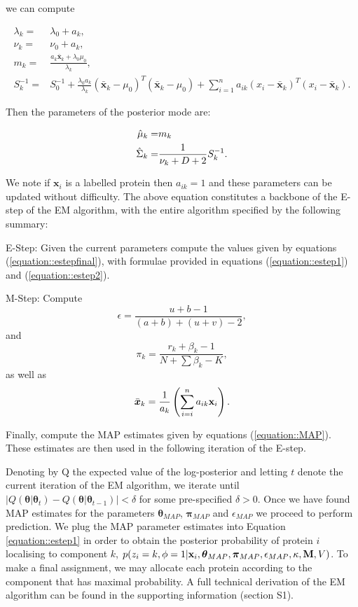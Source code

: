 \documentclass[12pt,english]{article}\usepackage[]{graphicx}\usepackage[]{color}
\begin{document}
we can compute

\begin{equation}\label{equation::Posterior}
\begin{split}
\lambda_k = &\lambda_0 + a_k, \\
\nu_k = & \nu_0 + a_k, \\
m_k = & \frac{a_k\bar{\boldsymbol{x}}_k + \lambda_0\mu_0}{\lambda_k},\\
S_k^{-1}  = & S_0^{-1} + \frac{\lambda_0 a_k}{\lambda_k}(\bar{\boldsymbol{x}}_k - \mu_0)^{T} (\bar{\boldsymbol{x}}_k - \mu_0) + \sum_{i=1}^{n} a_{ik}(x_i -\bar{\boldsymbol{x}}_k)^{T}(x_i -\bar{\boldsymbol{x}}_k).
\end{split}
\end{equation}

Then the parameters of the posterior mode are:

\begin{equation}\label{equation::MAP}
\begin{split}
\hat{{\bf\mu}}_k = &m_k \\
\hat{\Sigma}_k = &\frac{1}{\nu_k + D + 2}S_k^{-1}.
\end{split}
\end{equation}

We note if $\boldsymbol{x}_i$ is a labelled protein then $a_{ik} = 1$
and these parameters can be updated without difficulty.  The above
equation constitutes a backbone of the E-step of the EM algorithm, with
the entire algorithm specified by the following summary:


E-Step: Given the current parameters compute the values given by
equations (\ref{equation::estepfinal}), with formulae provided in
equations (\ref{equation::estep1}) and (\ref{equation::estep2}).

\bigskip

M-Step: Compute
\[\epsilon = \frac{ u + b - 1}{(a+b) + (u+v) - 2},\]
and
\[\pi_k = \frac{r_k + \beta_k - 1}{N + \sum \beta_k - K},\]
as well as
\[\bar{\boldsymbol{x}}_k = \frac{1}{a_k}\left(\sum_{i=i}^{n}a_{ik}{\bf x}_i\right).\]

Finally, compute the MAP estimates given by equations
(\ref{equation::MAP}). These estimates are then used in the following
iteration of the E-step.


Denoting by Q the expected value of the log-posterior and letting $t$
denote the current iteration of the EM algorithm, we iterate until
$\lvert Q(\boldsymbol{\theta}|\boldsymbol{\theta}_{t}) -
Q(\boldsymbol{\theta}|\boldsymbol{\theta}_{t-1})\rvert < \delta$ for
some pre-specified $\delta >0$.  Once we have found MAP estimates for
the parameters $\boldsymbol{\theta}_{MAP}$, $\boldsymbol{\pi}_{MAP}$
and $\epsilon_{MAP}$ we proceed to perform prediction. We plug the MAP
parameter estimates into Equation \eqref{equation::estep1} in order to
obtain the posterior probability of protein $i$ localising to
component $k$,
$p(z_i = k, \phi = 1 | {\bf x}_i, \boldsymbol{\theta}_{MAP},
\boldsymbol{\pi}_{MAP} , \epsilon_{MAP},\kappa, {\bf M}, V)$. To make
a final assignment, we may allocate each protein according to the
component that has maximal probability.  A full technical derivation
of the EM algorithm can be found in the supporting information (section S1).
\end{document}
